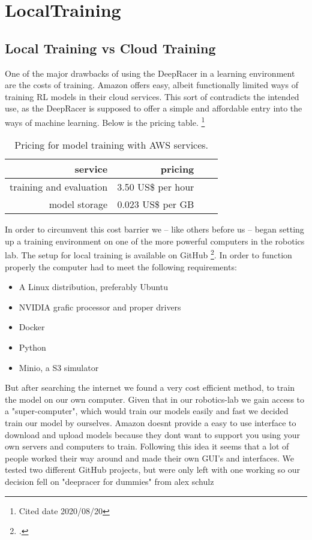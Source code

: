 \chapter{LocalTraining}

\section{Local Training vs Cloud Training}
One of the major drawbacks of using the DeepRacer in a learning environment are the costs of training. Amazon offers easy, albeit functionally limited ways of training RL models in their cloud services. This sort of contradicts the intended use, as the DeepRacer is supposed to offer a simple and affordable entry into the ways of machine learning. Below is the pricing table. \footnote{Cited date 2020/08/20}
 \begin{table}
 \caption{Pricing for model training with AWS services.}
 \label{tab:services}
 \centering
 \setlength{\tabcolsep}{5mm}
 \def\arraystretch{1.25}
 \begin{tabular}{|r|r|c|c|}
 \hline
 \textbf{service} & \textbf{pricing} \\
 \hline\hline
 training and evaluation & 3.50 US\$ per hour \\
 \hline
 model storage & 0.023 US\$ per GB \\
 \hline
 \end{tabular}
 \end{table}
 In order to circumvent this cost barrier we -- like others before us -- began setting up a training environment on one of the more powerful computers in the robotics lab.
 The setup for local training is available on GitHub \footcite{https://github.com/aws-deepracer-community/deepracer}. In order to function properly the computer had to meet the following requirements:
 \begin{itemize}
 \item A Linux distribution, preferably Ubuntu
 \item NVIDIA grafic processor and proper drivers
 \item Docker
 \item Python
 \item Minio, a S3 simulator
 \end{itemize}
But after searching the internet we found a very cost efficient method, to train the model on our own computer. Given that in our robotics-lab we gain access to a "super-computer", which would train our models easily and fast we decided train our model by ourselves. Amazon doesnt provide a easy to use interface to download and upload models because they dont want to support you using your own servers and computers to train. Following this idea it seems that a lot of people worked their way around and made their own GUI's and interfaces. We tested two different GitHub projects, but were only left with one working so our decision fell on "deepracer for dummies" from alex schulz 

